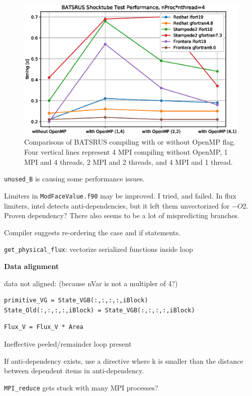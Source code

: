\documentclass[11pt]{book} %
\begin{document}
\begin{figure}[h]
    \centering
    \includegraphics[width=\textwidth]{./figures/shocktube_timing_4}
    \caption{Comparisons of BATSRUS compiling with or without OpenMP flag. Four vertical lines represent 4 MPI compiling without OpenMP, 1 MPI and 4 threads, 2 MPI and 2 threads, and 4 MPI and 1 thread.}
    \label{fig:shocktube_timing4}
\end{figure}

\verb|unused_B| is causing some performance issues.

Limiters in \verb|ModFaceValue.f90| may be improved. I tried, and failed. In flux limiters, intel detects anti-dependencies, but it left them unvectorized for $-O2$. Proven dependency? There also seems to be a lot of mispredicting branches.

Compiler suggests re-ordering the case and if statements.

\verb|get_physical_flux|: vectorize serialized functions inside loop

\textbf{Data alignment}

data not aligned: (because nVar is not a multipler of 4?)
\begin{verbatim}
primitive_VG = State_VGB(:,:,:,:,iBlock)
State_Old(:,:,:,:,iBlock) = State_VGB(:,:,:,:,iBlock)
\end{verbatim}

\begin{verbatim}
Flux_V = Flux_V * Area
\end{verbatim}
Ineffective peeled/remainder loop present

If anti-dependency exists, use a directive where k is smaller than the distance between dependent items in anti-dependency.

\verb|MPI_reduce| gets stuck with many MPI processes?
\end{document}
